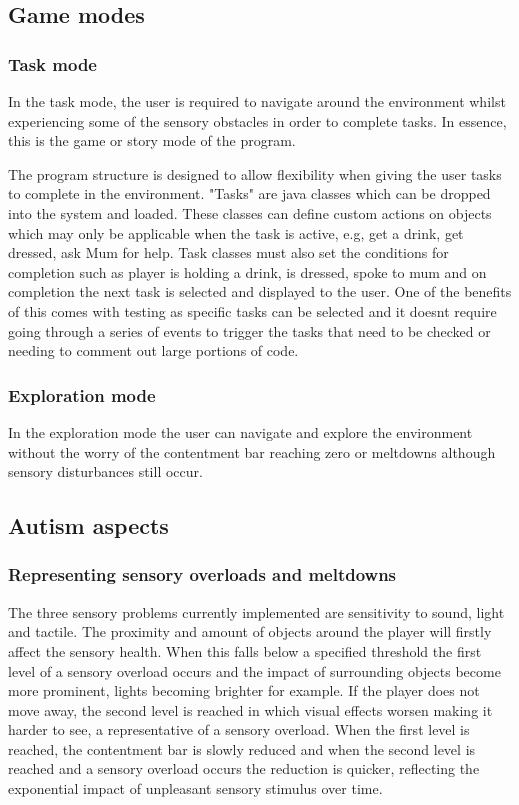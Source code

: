 \documentclass[11pt]{report}
\begin{document}
\subsection{Game modes}

\subsubsection*{Task mode}
In the task mode, the user is required to navigate around the environment
whilst experiencing some of the sensory obstacles in order to complete tasks.
In essence, this is the game or story mode of the program.

The program structure is designed to allow flexibility when giving the
user tasks to complete in the environment. "Tasks" are java classes which can be dropped into the system and loaded. These classes can define custom actions on objects which may only be applicable when the task is active, e.g,
get a drink, get dressed, ask Mum for help. Task classes must also set the conditions for completion such as player is holding a drink, is dressed, spoke to mum and on completion the next task is selected and displayed to the
user. One of the benefits of this comes with testing as specific tasks can be selected and it doesnt require going through a series of events to trigger the tasks that need to be checked or needing to comment out large portions of
code.

\subsubsection*{Exploration mode}
In the exploration mode the user can navigate and explore the environment without the worry of the contentment bar reaching zero or meltdowns although sensory disturbances still occur.

\subsection{Autism aspects}

\subsubsection{Representing sensory overloads and meltdowns}
The three sensory problems currently implemented are sensitivity to sound, light and tactile. The proximity and amount of objects around the player will firstly affect the sensory health. When this falls below a specified threshold
the first level of a sensory overload occurs and the impact of surrounding objects become more prominent, lights becoming brighter for example. If the player does not move away, the second level is reached in which visual effects
worsen making it harder to see, a representative of a sensory overload. When the first level is reached, the contentment bar is slowly reduced and when the second level is reached and a sensory overload occurs the reduction is quicker, reflecting the exponential impact of unpleasant sensory stimulus
over time.
\end{document}
